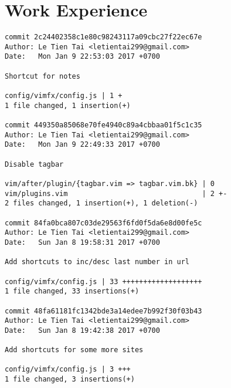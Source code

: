\section*{Work Experience}
\begin{verbatim}
commit 2c24402358c1e80c98243117a09cbc27f22ec67e
Author: Le Tien Tai <letientai299@gmail.com>
Date:   Mon Jan 9 22:53:03 2017 +0700

Shortcut for notes

config/vimfx/config.js | 1 +
1 file changed, 1 insertion(+)

commit 449350a85068e70fe4940c89a4cbbaa01f5c1c35
Author: Le Tien Tai <letientai299@gmail.com>
Date:   Mon Jan 9 22:49:33 2017 +0700

Disable tagbar

vim/after/plugin/{tagbar.vim => tagbar.vim.bk} | 0
vim/plugins.vim                                | 2 +-
2 files changed, 1 insertion(+), 1 deletion(-)

commit 84fa0bca807c03de29563f6fd0f5da6e8d00fe5c
Author: Le Tien Tai <letientai299@gmail.com>
Date:   Sun Jan 8 19:58:31 2017 +0700

Add shortcuts to inc/desc last number in url

config/vimfx/config.js | 33 +++++++++++++++++++
1 file changed, 33 insertions(+)

commit 48fa61181fc1342bde3a14edee7b992f30f03b43
Author: Le Tien Tai <letientai299@gmail.com>
Date:   Sun Jan 8 19:42:38 2017 +0700

Add shortcuts for some more sites

config/vimfx/config.js | 3 +++
1 file changed, 3 insertions(+)
\end{verbatim}